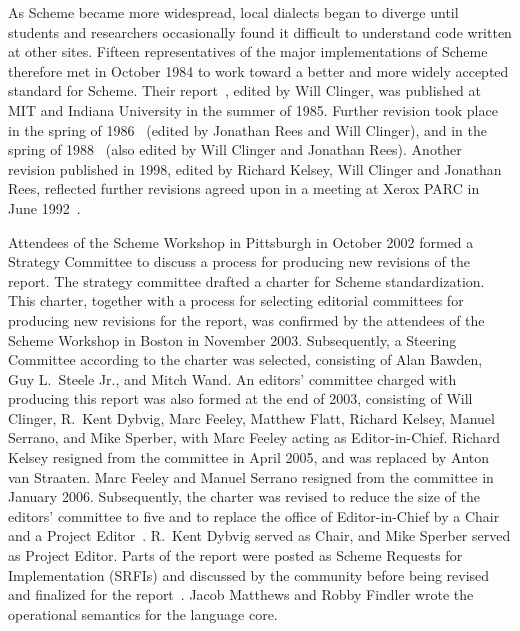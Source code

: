 \vest As Scheme became more widespread,
local dialects began to diverge until students and researchers
occasionally found it difficult to understand code written at other
sites.
Fifteen representatives of the major implementations of Scheme therefore
met in October 1984 to work toward a better and more widely accepted
standard for Scheme.
%
Their report~\cite{RRRS}, edited by Will Clinger,
was published at MIT and Indiana University in the summer of 1985.
Further revision took place in the spring of 1986~\cite{R3RS} (edited
by Jonathan Rees and Will Clinger),
and in the spring of 1988~\cite{R4RS} (also edited by Will Clinger and
Jonathan Rees).  Another revision published in 1998, edited
by Richard Kelsey, Will Clinger and Jonathan Rees,
reflected further revisions agreed upon in a meeting at Xerox PARC in
June 1992~\cite{R5RS}.

Attendees of the Scheme Workshop in Pittsburgh in October 2002 formed
a Strategy Committee to discuss a process for producing new revisions
of the report.  The strategy committee drafted a charter for Scheme
standardization.  This charter, together with a process for selecting
editorial committees for producing new revisions for the report, was
confirmed by the attendees of the Scheme Workshop in Boston in
November 2003.  Subsequently, a Steering Committee according to the
charter was selected, consisting of Alan Bawden, Guy L.\ Steele Jr.,
and Mitch Wand.  An editors' committee charged with producing this report was
also formed at the end of 2003, consisting of Will Clinger,
R.\ Kent Dybvig, Marc Feeley, Matthew Flatt, Richard Kelsey, Manuel
Serrano, and Mike Sperber, with Marc Feeley acting as Editor-in-Chief.
Richard Kelsey resigned from the committee in April 2005, and was
replaced by Anton van Straaten.  
Marc Feeley and Manuel Serrano
resigned from the committee in January 2006.  Subsequently, the charter
was revised to reduce the size of the editors' committee to five and
to replace the office of Editor-in-Chief by a Chair and a Project
Editor~\cite{SchemeCharter2006}.  R.\ Kent Dybvig served as Chair, and
Mike Sperber served as Project Editor.
Parts of the report were posted as Scheme Requests for Implementation
(SRFIs) and discussed by the community before being revised and finalized for
the report~\cite{srfi75,srfi76,srfi77,srfi83,srfi93}.
Jacob Matthews and Robby
Findler wrote the operational semantics for the language core.

